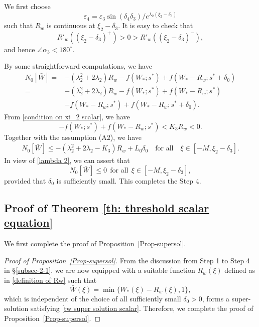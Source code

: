 \documentclass[11pt,a4paper]{article}
\numberwithin{equation}{section}
\numberwithin{figure}{section}
\newcommand{\red}[1]{{\color{red}#1}}
\newcommand\beaa{\begin{eqnarray*}}
\newcommand\eeaa{\end{eqnarray*}}
\begin{document}
We first choose 
$$\varepsilon_4=\varepsilon_3\sin(\delta_4\delta_3)/e^{\lambda_2(\xi_2-\delta_3)}$$
such that $R_w$ is continuous at $\xi_2-\delta_3$. It is easy to check that 
$$R'_w((\xi_2-\delta_3)^+)>0>R'_w((\xi_2-\delta_3)^-),$$
 and hence $\angle\alpha_3< 180^{\circ}$.

By some  straightforward computations, we have
\begin{equation*}
\begin{aligned}
N_0[\bar W]=&-(\lambda_2^2+2\lambda_2)R_w-f(W_*;s^*)+f(W_*-R_w;s^*+\delta_0)\\
=&-(\lambda_2^2+2\lambda_2)R_w-f(W_*;s^*)+f(W_*-R_w;s^*)\\
&-f(W_*-R_w;s^*)+f(W_*-R_w;s^*+\delta_0).
\end{aligned}
\end{equation*}
From \eqref{condition on xi_2 scalar}, we have 
$$-f(W_*;s^*)+f(W_*-R_w;s^*)< K_3R_w<0.$$
Together with the assumption  (A2), we have
\beaa
N_0[\bar W]\leq -(\lambda_2^2+2\lambda_2-K_3)R_w+L_0\delta_0\quad\text{for all}\quad \xi\in[-M,\xi_2-\delta_3].
\eeaa
In view of  \eqref{lambda 2},
we can assert that 
$$N_0[\bar W]\le 0\ \ \text{for all}\ \ \xi\in[-M,\xi_2-\delta_3],$$
 provided that $\delta_0$ is sufficiently small.
This completes the Step 4.


\subsection{Proof of Theorem \ref{th: threshold scalar equation}}

\noindent

We first complete the proof of Proposition~\ref{Prop-supersol}.
\begin{proof}[Proof of Proposition~\ref{Prop-supersol}]
From the discussion from Step 1 to Step 4 in \S \ref{subsec-2-1},
we are now equipped with a suitable function $R_w(\xi)$ %
defined as in \eqref{definition of Rw} such that 
$$\bar W (\xi)=\min \{W_*(\xi)-R_w(\xi),1\},$$
 which is independent of the choice of all sufficiently small $\delta_0>0$, forms
a super-solution satisfying \eqref{tw super solution scalar}.
Therefore, we complete the proof of Proposition~\ref{Prop-supersol}.
\end{proof}
\end{document}
